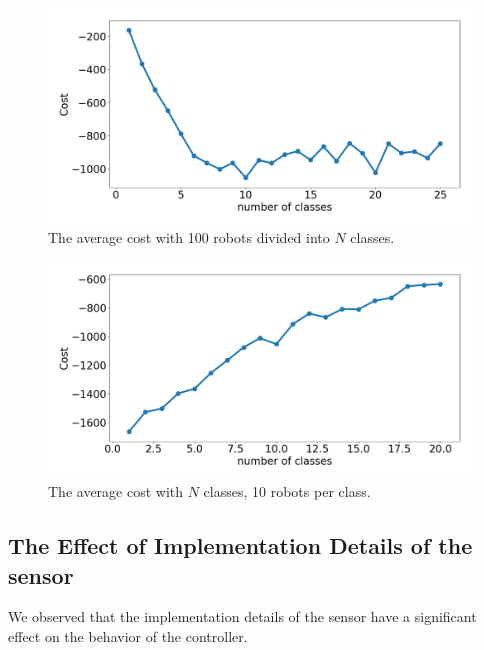 \documentclass[conference]{IEEEtran}
\begin{document}
\begin{figure}[H]
  \centering
  \includegraphics[width=1\linewidth]{./images/num_classes_vs_cost_100_robots.png}
  \caption{The average cost with 100 robots divided into $N$ classes.}
  \label{fig:num_classes_100}
\end{figure}

\begin{figure}[H]
  \centering
  \includegraphics[width=1\linewidth]{./images/num_classes_vs_cost_10_per_class.png}
  \caption{The average cost with $N$ classes, 10 robots per class.}
  \label{fig:num_classes_10}
\end{figure}

\subsection{The Effect of Implementation Details of the sensor} \label{section:sensor_impl}

We observed that the implementation details of the sensor have a significant
effect on the behavior of the controller.
\end{document}
